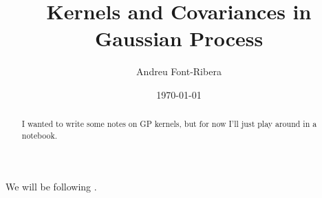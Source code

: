 \documentclass[preprintnumbers,prd,superscriptaddress,notitlepage,nofootinbib] {revtex4-1}
\begin{document}
\title{Kernels and Covariances in Gaussian Process}

\author{Andreu Font-Ribera} 
\date{\today}

\begin{abstract}
I wanted to write some notes on GP kernels, but for now I'll just play around in a notebook.
\end{abstract}

\maketitle

We will be following \cite{2006gpml.book.....R}. 





\end{document}
